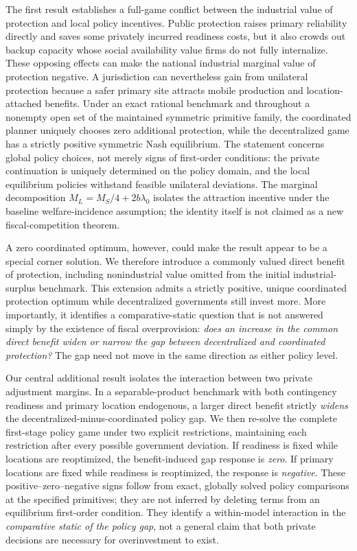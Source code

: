 The first result establishes a full-game conflict between the industrial value of protection and local policy incentives. Public protection raises primary reliability directly and saves some privately incurred readiness costs, but it also crowds out backup capacity whose social availability value firms do not fully internalize. These opposing effects can make the national industrial marginal value of protection negative. A jurisdiction can nevertheless gain from unilateral protection because a safer primary site attracts mobile production and location-attached benefits. Under an exact rational benchmark and throughout a nonempty open set of the maintained symmetric primitive family, the coordinated planner uniquely chooses zero additional protection, while the decentralized game has a strictly positive symmetric Nash equilibrium. The statement concerns global policy choices, not merely signs of first-order conditions: the private continuation is uniquely determined on the policy domain, and the local equilibrium policies withstand feasible unilateral deviations. The marginal decomposition $M_L=M_S/4+2b\lambda_0$ isolates the attraction incentive under the baseline welfare-incidence assumption; the identity itself is not claimed as a new fiscal-competition theorem.

A zero coordinated optimum, however, could make the result appear to be a special corner solution. We therefore introduce a commonly valued direct benefit of protection, including nonindustrial value omitted from the initial industrial-surplus benchmark. This extension admits a strictly positive, unique coordinated protection optimum while decentralized governments still invest more. More importantly, it identifies a comparative-static question that is not answered simply by the existence of fiscal overprovision: \emph{does an increase in the common direct benefit widen or narrow the gap between decentralized and coordinated protection?} The gap need not move in the same direction as either policy level.

Our central additional result isolates the interaction between two private adjustment margins. In a separable-product benchmark with both contingency readiness and primary location endogenous, a larger direct benefit strictly \emph{widens} the decentralized-minus-coordinated policy gap. We then re-solve the complete first-stage policy game under two explicit restrictions, maintaining each restriction after every possible government deviation. If readiness is fixed while locations are reoptimized, the benefit-induced gap response is \emph{zero}. If primary locations are fixed while readiness is reoptimized, the response is \emph{negative}. These positive--zero--negative signs follow from exact, globally solved policy comparisons at the specified primitives; they are not inferred by deleting terms from an equilibrium first-order condition. They identify a within-model interaction in the \emph{comparative static of the policy gap}, not a general claim that both private decisions are necessary for overinvestment to exist.


